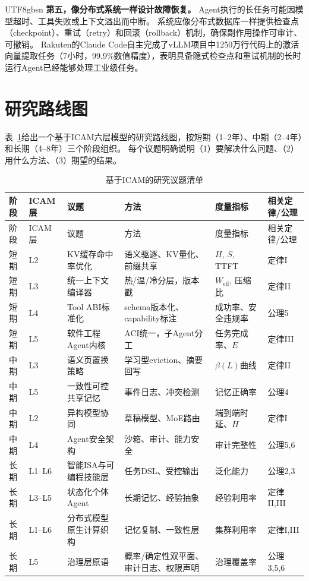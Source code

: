 \documentclass[11pt,a4paper]{article}
\begin{document}
\begin{CJK*}{UTF8}{gbsn}
\textbf{第五，像分布式系统一样设计故障恢复。}
Agent执行的长任务可能因模型超时、工具失败或上下文溢出而中断。
系统应像分布式数据库一样提供检查点（checkpoint）、重试（retry）和回滚（rollback）机制，确保副作用操作可审计、可撤销\cite{raft2014,spanner2012}。
Rakuten的Claude Code自主完成了vLLM项目中1250万行代码上的激活向量提取任务（7小时，99.9\%数值精度）\cite{anthropic2026agenticreport}，表明具备隐式检查点和重试机制的长时运行Agent已经能够处理工业级任务。

\section{研究路线图}
\label{sec:roadmap}

表~\ref{tab:roadmap}给出一个基于ICAM六层模型的研究路线图，按短期（1--2年）、中期（2--4年）和长期（4--8年）三个阶段组织。
每个议题明确说明（1）要解决什么问题、（2）用什么方法、（3）期望的结果。

\begin{longtable}{p{}p{}p{}p{}p{}p{}}
\caption{基于ICAM的研究议题清单}
\label{tab:roadmap}\\
\toprule
阶段 & ICAM层 & 议题 & 方法 & 度量指标 & 相关定律/公理 \\
\midrule
\endfirsthead
\toprule
阶段 & ICAM层 & 议题 & 方法 & 度量指标 & 相关定律/公理 \\
\midrule
\endhead
短期 & L2 & KV缓存命中率优化 & 语义驱逐、KV量化、前缀共享 & $H$, $S$, TTFT & 定律I \\
短期 & L3 & 统一上下文编译器 & 热/温/冷分层，版本戳 & $W_{\mathrm{eff}}$, 压缩比 & 定律II \\
短期 & L4 & Tool ABI标准化 & schema版本化、capability标注 & 成功率、安全违规率 & 公理5 \\
短期 & L5 & 软件工程Agent内核 & ACI统一，子Agent分工 & 任务完成率、$E$ & 定律III \\
中期 & L3 & 语义页置换策略 & 学习型eviction、摘要回写 & $\beta(L)$曲线 & 定律II \\
中期 & L5 & 一致性可控共享记忆 & 事件日志、冲突检测 & 记忆正确率 & 公理4 \\
中期 & L2 & 异构模型协同 & 草稿模型、MoE路由 & 端到端时延、$H$ & 定律I \\
中期 & L4 & Agent安全架构 & 沙箱、审计、能力安全 & 审计完整性 & 公理5,6 \\
长期 & L1--L6 & 智能ISA与可编程技能层 & 任务DSL、受控输出 & 泛化能力 & 公理2,3 \\
长期 & L3--L5 & 状态化个体Agent & 长期记忆、经验抽象 & 经验利用率 & 定律II,III \\
长期 & L1--L6 & 分布式模型原生计算织构 & 记忆复制、一致性层 & 集群利用率 & 定律I,III \\
长期 & L5 & 治理层原语 & 概率/确定性双平面、审计日志、权限声明 & 治理覆盖率 & 公理3,5,6 \\
\bottomrule
\end{longtable}


\end{CJK*}
\end{document}
